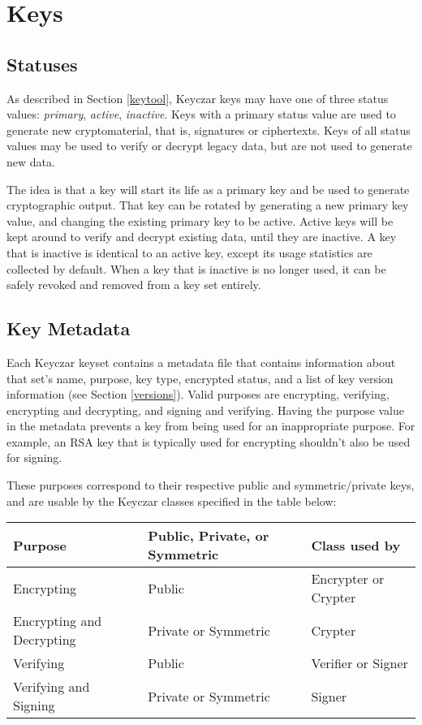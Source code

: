 \documentclass{llncs}
\begin{document}
\section{Keys}

\subsection{Statuses}\label{status}

As described in Section \ref{keytool}, Keyczar keys may have one of three
status values: {\it primary}, {\it active}, {\it inactive}.
Keys with a primary status value are used to generate new cryptomaterial, that
is, signatures or ciphertexts. Keys of all status values may be used to verify
or decrypt legacy data, but are not used to generate new data.

The idea is that a key will start its life as a primary key and be used to
generate cryptographic output. That key can be rotated by generating a new
primary key value, and changing the existing primary key to be active. Active
keys will be kept around to verify and decrypt existing data, until they are
inactive. A key that is inactive is identical
to an active key, except its usage statistics are collected by default. When a
key that is inactive is no longer used, it can be safely
revoked and removed from a key set entirely.

\subsection{Key Metadata}\label{metadata}

Each Keyczar keyset contains a metadata file that contains information about
that set's name, purpose, key type, encrypted status, and a list of key version
information (see Section \ref{versions}). Valid purposes are encrypting, 
verifying, encrypting and decrypting, and signing and verifying. Having the
purpose value in the metadata prevents a key from being used for an 
inappropriate purpose. For example, an RSA key that is typically used for
encrypting shouldn't also be used for signing.

These purposes correspond to their respective public and symmetric/private
keys, and are usable by the Keyczar classes specified in the table below: 

\vspace*{3mm}
\begin{tabular}{ l | l | l }
{\bf Purpose} &  {\bf Public, Private, or Symmetric } & {\bf Class used by} \\
\hline Encrypting & Public & Encrypter or Crypter \\ \hline
Encrypting and Decrypting & Private or Symmetric & Crypter \\ \hline
Verifying & Public & Verifier or Signer \\ \hline 
Verifying and Signing & Private or Symmetric & Signer \\ \hline
\end{tabular}
\vspace*{3mm}
\end{document}
